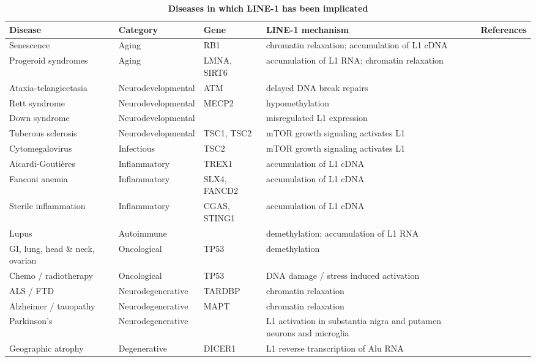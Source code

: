 \documentclass[11pt,twocolumn,twoside]{extarticle}
\begin{document}
\begin{table}[!t]
\caption{\textbf{Diseases in which LINE-1 has been implicated}}
\label{tab:diseases}
\vspace{0.3em}
\footnotesize
\setlength{\tabcolsep}{4pt}
\renewcommand{\arraystretch}{1.12}
\begin{tabularx}{\textwidth}{@{}>{\RaggedRight\arraybackslash}p{4.15cm} >{\RaggedRight\arraybackslash}p{3.15cm} >{\RaggedRight\arraybackslash}p{2.05cm} Y l@{}}
\toprule
\textbf{Disease} & \textbf{Category} & \textbf{Gene} & \textbf{LINE-1 mechanism} & \textbf{References} \\
\midrule
Senescence & Aging & RB1 & chromatin relaxation; accumulation of L1 cDNA & \cite{cecco} \\
Progeroid syndromes & Aging & LMNA, SIRT6 & accumulation of L1 RNA; chromatin relaxation & \cite{simon,dellavalle} \\
Ataxia-telangiectasia & Neurodevelopmental & ATM & delayed DNA break repairs & \cite{jacob,takahashi,coufal} \\
Rett syndrome & Neurodevelopmental & MECP2 & hypomethylation & \cite{muotri,jacob,martins} \\
Down syndrome & Neurodevelopmental &  & misregulated L1 expression & \cite{martinez,borgognone} \\
Tuberous sclerosis & Neurodevelopmental & TSC1, TSC2 & mTOR growth signaling activates L1 & \cite{jacob,martin} \\
Cytomegalovirus & Infectious & TSC2 & mTOR growth signaling activates L1 & \cite{hwang,park} \\
Aicardi-Gouti\`eres & Inflammatory & TREX1 & accumulation of L1 cDNA & \cite{thomas,crow} \\
Fanconi anemia & Inflammatory & SLX4, FANCD2 & accumulation of L1 cDNA & \cite{bregnard} \\
Sterile inflammation & Inflammatory & CGAS, STING1 & accumulation of L1 cDNA & \cite{cecco} \\
Lupus & Autoimmune &  & demethylation; accumulation of L1 RNA & \cite{mavragani} \\
GI, lung, head \& neck, ovarian & Oncological & TP53 & demethylation & \cite{rodriguez,gasior,zhang,mendez,rajurkar,pisanic} \\
Chemo / radiotherapy & Oncological & TP53 & DNA damage / stress induced activation & \cite{rajurkar} \\
ALS / FTD & Neurodegenerative & TARDBP & chromatin relaxation & \cite{liu} \\
Alzheimer / tauopathy & Neurodegenerative & MAPT & chromatin relaxation & \cite{guo,sun,herdy} \\
Parkinson's & Neurodegenerative &  & L1 activation in substantia nigra and putamen neurons and microglia & \cite{garza,gordillo} \\
Geographic atrophy & Degenerative & DICER1 & L1 reverse transcription of Alu RNA & \cite{fukuda} \\
\bottomrule
\end{tabularx}
\end{table}
\end{document}
